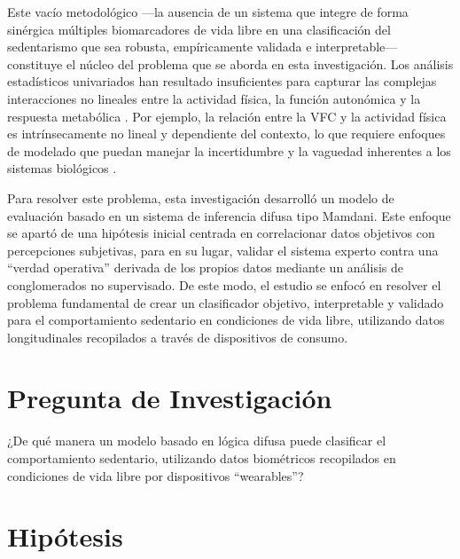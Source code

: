 Este vacío metodológico ---la ausencia de un sistema que integre de forma sinérgica múltiples biomarcadores de vida libre en una clasificación del sedentarismo que sea robusta, empíricamente validada e interpretable--- constituye el núcleo del problema que se aborda en esta investigación. Los análisis estadísticos univariados han resultado insuficientes para capturar las complejas interacciones no lineales entre la actividad física, la función autonómica y la respuesta metabólica \citep{Aubert2022GlobalMatrix}. Por ejemplo, la relación entre la VFC y la actividad física es intrínsecamente no lineal y dependiente del contexto, lo que requiere enfoques de modelado que puedan manejar la incertidumbre y la vaguedad inherentes a los sistemas biológicos \citep{Deka2023Nonlinear}.

Para resolver este problema, esta investigación desarrolló un modelo de evaluación basado en un sistema de inferencia difusa tipo Mamdani. Este enfoque se apartó de una hipótesis inicial centrada en correlacionar datos objetivos con percepciones subjetivas, para en su lugar, validar el sistema experto contra una ``verdad operativa'' derivada de los propios datos mediante un análisis de conglomerados no supervisado. De este modo, el estudio se enfocó en resolver el problema fundamental de crear un clasificador objetivo, interpretable y validado para el comportamiento sedentario en condiciones de vida libre, utilizando datos longitudinales recopilados a través de dispositivos de consumo.

\section{Pregunta de Investigación}
\label{sec:pregunta_investigacion}

¿De qué manera un modelo basado en lógica difusa puede clasificar el comportamiento sedentario, utilizando datos biométricos recopilados en condiciones de vida libre por dispositivos ``wearables''?

\section{Hipótesis}
\label{sec:hipotesis}

